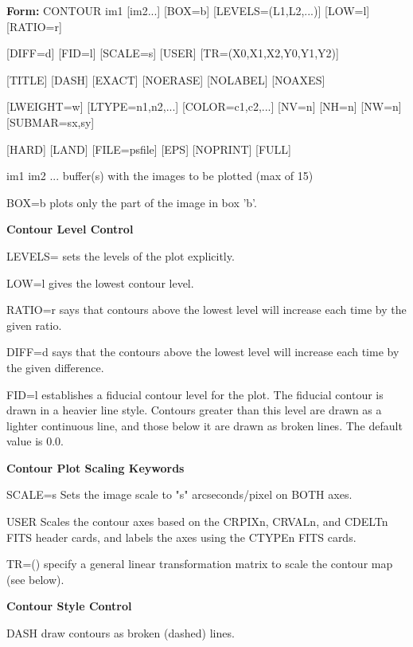 {\newpage\clearpage
{}%
\begin{command} 
  \item[\textbf{Form:} CONTOUR im1 {[im2...]} {[BOX=b]} 
       {[LEVELS=(L1,L2,...)]} {[LOW=l]} {[RATIO=r]} ]{}
  \item[{[DIFF=d]} {[FID=l]} {[SCALE=s]} {[USER]} 
        {[TR=(X0,X1,X2,Y0,Y1,Y2)]} ]{}
  \item[{[TITLE]} {[DASH]} {[EXACT]} {[NOERASE]} {[NOLABEL]} {[NOAXES]}]{}
  \item[{[LWEIGHT=w]} {[LTYPE=n1,n2,...]} {[COLOR=c1,c2,...]} {[NV=n]} 
        {[NH=n]} {[NW=n]} {[SUBMAR=sx,sy]}]{}
  \item[{[HARD]} {[LAND]} {[FILE=psfile]} {[EPS]} {[NOPRINT]} {[FULL]} ]{}
  \item[im1 im2 ...]{buffer(s) with the images to be plotted (max of 15)}
  \item[BOX=b]{plots only the part of the image in box 'b'.}
  \item[\textbf{Contour Level Control}\hfill]{}
  \item[LEVELS=]{sets the levels of the plot explicitly.}
  \item[LOW=l]{gives the lowest contour level.}
  \item[RATIO=r]{says that contours above the lowest level will increase
       each time by the given ratio.}
  \item[DIFF=d]{says that the contours above the lowest level will
       increase each time by the given difference.}
  \item[FID=l]{establishes a fiducial contour level for the plot.  The
       fiducial contour is drawn in a heavier line style.
       Contours greater than this level are drawn as a lighter
       continuous line, and those below it are drawn as broken
       lines.  The default value is 0.0.}
  \item[\textbf{Contour Plot Scaling Keywords}\hfill]{}
  \item[SCALE=s]{Sets the image scale to "s" arcseconds/pixel on BOTH axes.}
  \item[USER]{Scales the contour axes based on the CRPIXn, CRVALn,
       and CDELTn FITS header cards, and labels the axes using
       the CTYPEn FITS cards.}
  \item[TR=()]{specify a general linear transformation matrix to scale
       the contour map (see below).}
  \item[\textbf{Contour Style Control}\hfill]{}
  \item[DASH]{draw contours as broken (dashed) lines.}

\end{command}}
